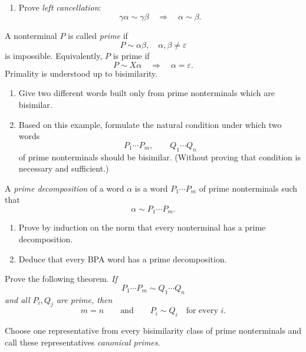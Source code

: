 \documentclass[11pt,a4paper,lmodern]{tutorial}
\newcommand{\ew}{\ensuremath{\varepsilon}}
\begin{document}
\begin{unfinished}
\begin{exercise}
\begin{enumerate}[label=(\alph*)]
\item Prove \emph{left cancellation}:
      \[
          \gamma\alpha\sim\gamma\beta
          \quad\Longrightarrow\quad
          \alpha\sim\beta.
      \]
 
\end{enumerate}

A nonterminal $P$ is called \emph{prime} if
\[
     P\sim \alpha\beta,\quad \alpha,\beta\neq\ew
\]
is impossible. Equivalently, $P$ is prime if
\[
     P\sim X\alpha
     \quad\Longrightarrow\quad
     \alpha=\ew.
\]
Primality is understood up to bisimilarity.
\end{exercise}

\begin{exercise}
\begin{enumerate}[label=(\alph*)]
\item Give two different words built only from prime nonterminals which are
      bisimilar.
\item Based on this example, formulate the natural condition under which
      two words
      \[
          P_1\cdots P_m,\qquad Q_1\cdots Q_n
      \]
      of prime nonterminals should be bisimilar. (Without proving that condition is necessary and sufficient.)
\end{enumerate}
\end{exercise}

\begin{exercise}
A \emph{prime decomposition} of a word $\alpha$ is a word
$P_1\cdots P_m$ of prime nonterminals such that
\[
    \alpha\sim P_1\cdots P_m.
\]

\begin{enumerate}[label=(\alph*)]
\item Prove by induction on the norm that every nonterminal has a prime
      decomposition.
\item Deduce that every BPA word has a prime decomposition.
\end{enumerate}
\end{exercise}

\begin{exercise}
Prove the following theorem.
\medskip
\emph{If}
\[
    P_1\cdots P_m\sim Q_1\cdots Q_n
\]
\emph{and all $P_i,Q_j$ are prime, then}
\[
    m=n
    \qquad\text{and}\qquad
    P_i\sim Q_i
    \quad\text{for every }i.
\]
\end{exercise}


\begin{exercise}
Choose one representative from every bisimilarity class of prime
nonterminals and call these representatives \emph{canonical primes}.


\end{exercise}
\end{unfinished}
\end{document}
